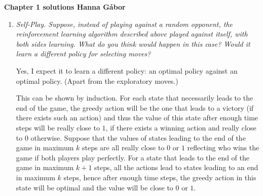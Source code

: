 \documentclass[12pt,a4paper]{article}
\begin{document}
\textbf{Chapter 1 solutions  \hfill Hanna Gábor}\\

\begin{enumerate}
  \item
    \textit{
      Self-Play. Suppose, instead of playing against a random opponent, the reinforcement learning algorithm described above played against itself, with both sides learning. What do you think would happen in this case? Would it learn a different policy for selecting moves?}

    Yes, I expect it to learn a different policy: an optimal policy against an optimal policy. (Apart from the exploratory moves.)

    This can be shown by induction. For each state that necessarily leads to the end of the game, the greedy action will be the one that leads to a victory (if there exists such an action) and thus the value of this state after enough time steps will be really close to $1$, if there exists a winning action and really close to $0$ otherwise. Suppose that the values of states leading to the end of the game in maximum $k$ steps are all really close to $0$ or $1$ reflecting who wins the game if both players play perfectly. For a state that leads to the end of the game in maximum $k + 1$ steps, all the actions lead to states leading to an end in maximum $k$ steps, hence after enough time steps, the greedy action in this state will be optimal and the value will be close to $0$ or $1$.

\end{enumerate}
\end{document}
